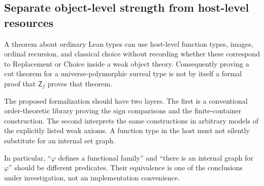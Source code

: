 \documentclass[11pt,letterpaper]{article}
\theoremstyle{definition}
\theoremstyle{remark}
\newcommand{\Zf}{\mathsf{Z}_{\!f}}
\begin{document}

\subsection{Separate object-level strength from host-level resources}
A theorem about ordinary Lean types can use host-level function types, images, ordinal recursion, and classical choice without recording whether these correspond to Replacement or Choice inside a weak object theory. Consequently proving a cut theorem for a universe-polymorphic surreal type is not by itself a formal proof that $\Zf$ proves that theorem.

The proposed formalization should have two layers. The first is a conventional order-theoretic library proving the sign comparisons and the finite-container construction. The second interprets the same constructions in arbitrary models of the explicitly listed weak axioms. A function type in the host must not silently substitute for an internal set graph.

In particular, ``$\varphi$ defines a functional family'' and ``there is an internal graph for $\varphi$'' should be different predicates. Their equivalence is one of the conclusions under investigation, not an implementation convenience.
\end{document}
